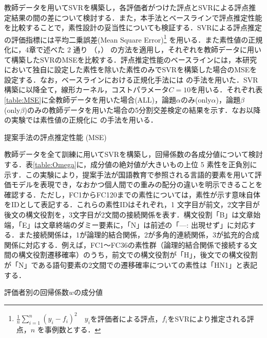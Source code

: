 \documentclass[japanese]{jnlp_1.5}
\newenvironment{iindent1zw}{}{}
\begin{document}
\begin{iindent1zw}
教師データを用いてSVRを構築し，各評価者がつけた評点とSVRによる評点推定結果の間の差について検討する．また，本手法とベースラインで評点推定性能を比較することで，素性設計の妥当性についても検証する．SVRによる評点推定の評価指標には平均二乗誤差(Mean Square Error)\footnote{
$\frac{1}{n}\sum^{n}_{i=1}{(y_{i}-f_{i})}^2\quad y_{i}$を評価者による評点，$f_{i}$をSVRにより推定される評点，$n$ を事例数とする．}
を用いる．また素性値の正規化に，4章で述べた 2 通り
（，）
の方法を適用し，それぞれを教師データに用いて構築したSVRのMSEを比較する．評点推定性能のベースラインには，本研究において独自に設定した素性を除いた素性のみでSVRを構築した場合のMSEを設定する．なお，ベースラインにおける正規化手法には
の手法を用いた．SVR構築に以降全て，線形カーネル，コストパラメータ$C=10$を用いる．それぞれ表\ref{table:MSE}に全教師データを用いた場合(ALL)，論題$\alpha$のみ(only$\alpha$)，論題$\beta$ (only$\beta$)のみの教師データを用いた場合の5分割交差検定の結果を示す．なお以降の実験では素性値の正規化に
の手法を用いる．
\end{iindent1zw}


\begin{table}[t]
\caption{提案手法の評点推定性能 (MSE)}
\label{table:MSE}

\end{table}


\noindent {}

\begin{iindent1zw}
教師データを全て訓練に用いてSVRを構築し，回帰係数の各成分値について検討する．表\ref{table:Omega}に，成分値の絶対値が大きいもの上位 5 素性を正負別に示す．この実験により，提案手法が国語教育で参照される言語的要素を用いて評価モデルを表現でき，なおかつ個人間での重みの配分の違いを明示できることを確認する．ただし，FC1からFC120までの素性については，素性が示す意味自体をIDとして表記する．これらの素性IDはそれぞれ，1 文字目が前文，2文字目が後文の構文役割を，3文字目が2文間の接続関係を表す．構文役割「B」は文章始端，「E」は文章終端のダミー要素に，「N」は前述の「---: 出現せず」に対応する．また接続関係は，1が論理的結合関係，2が多角的連続関係，3が拡充的合成関係に対応する．例えば，FC1〜FC36の素性群（論理的結合関係で接続する文間の構文役割遷移確率）のうち，前文での構文役割が「H」，後文での構文役割が「N」である語句要素の2文間での遷移確率についての素性は「HN1」と表記する．
\end{iindent1zw}

\begin{table}[t]
\caption{評価者別の回帰係数$w$の成分値}
\label{table:Omega}

\end{table}
\end{document}
